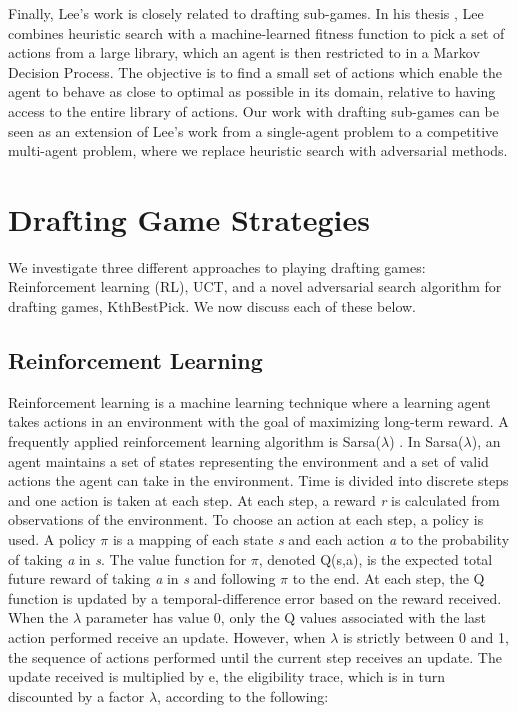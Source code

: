 \documentclass[letterpaper]{article}
\numberwithin{equation}{section}
\numberwithin{theorem}{section}
\numberwithin{lemma}{section}
\numberwithin{df}{section}
\begin{document}

Finally, Lee's work is closely related to drafting sub-games.  In his thesis \cite{GregLeeThesis}, Lee combines heuristic search with a machine-learned fitness function to pick a set of actions from a large library, which an agent is then restricted to in a Markov Decision Process.  The objective is to find a small set of actions which enable the agent to behave as close to optimal as possible in its domain, relative to having access to the entire library of actions.  Our work with drafting sub-games can be seen as an extension of Lee's work from a single-agent problem to a competitive multi-agent problem, where we replace heuristic search with adversarial methods. 

\section{Drafting Game Strategies}
\label{sec:drafting}

We investigate three different approaches to playing drafting games: Reinforcement learning (RL), UCT, and a novel adversarial search algorithm for drafting games, KthBestPick.  We now discuss each of these below.

\subsection{Reinforcement Learning}

Reinforcement learning is a machine learning technique where a learning agent takes actions in an environment with the goal of maximizing long-term reward.  A frequently applied reinforcement learning algorithm is Sarsa($\lambda$) \cite{SuttonBarto1998}.  In Sarsa($\lambda$), an agent maintains a set of states representing the environment and a set of valid actions the agent can take in the environment. Time is divided into discrete steps and one action is taken at each step.  At each step, a reward \textit{r} is calculated from observations of the environment.   To choose an action at each step, a policy is used.  A policy $\pi$ is a mapping of each state \textit{s} and each action \textit{a} to the probability of taking \textit{a} in \textit{s}.  The value function for $\pi$, denoted Q(s,a), is the expected total future reward of taking \textit{a} in \textit{s} and following $\pi$ to the end.  At each step, the Q function is updated by a temporal-difference error based on the reward received.
When the $\lambda$ parameter has value 0, only the Q values associated with the last action performed receive an update. However, when $\lambda$ is strictly between 0 and 1, the sequence of actions performed until the current step receives an update.  The update received is multiplied by e, the eligibility trace, which is in turn discounted by a factor $\lambda$, according to the following:
\end{document}
